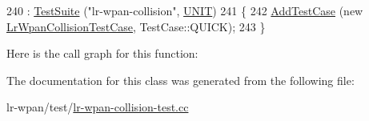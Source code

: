 \begin{DoxyCode}
240   : \hyperlink{classns3_1_1TestSuite_a904b0c40583b744d30908aeb94636d1a}{TestSuite} (\textcolor{stringliteral}{"lr-wpan-collision"}, \hyperlink{classns3_1_1TestSuite_a1ebfcab34ec8161e085e8e3a1855eae0a3885375a3787abf60431f8454b3cadbd}{UNIT})
241 \{
242   \hyperlink{classns3_1_1TestCase_a3718088e3eefd5d6454569d2e0ddd835}{AddTestCase} (\textcolor{keyword}{new} \hyperlink{classLrWpanCollisionTestCase}{LrWpanCollisionTestCase}, TestCase::QUICK);
243 \}
\end{DoxyCode}


Here is the call graph for this function\+:




The documentation for this class was generated from the following file\+:\begin{DoxyCompactItemize}
\item 
lr-\/wpan/test/\hyperlink{lr-wpan-collision-test_8cc}{lr-\/wpan-\/collision-\/test.\+cc}\end{DoxyCompactItemize}
